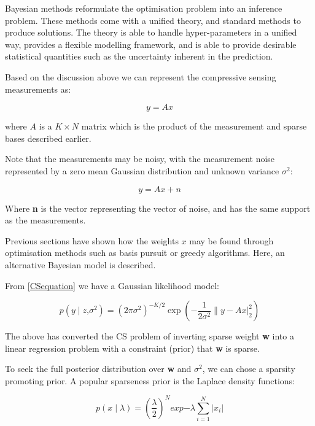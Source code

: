 \documentclass[12pt]{report}
\begin{document}
Bayesian methods reformulate the optimisation problem into an inference problem. These methods come with a unified theory, and standard methods to produce solutions. The theory is able to handle hyper-parameters in a unified way, provides a flexible modelling framework, and is able to provide desirable statistical quantities such as the uncertainty inherent in the prediction.

Based on the discussion above we can represent the compressive sensing measurements as: 

\begin{equation}
y = Ax
\end{equation}

where \(A\) is a \(K \times	N\) matrix which is the product of the measurement and sparse bases described earlier.

Note that the measurements may be noisy, with the measurement noise represented by a zero mean Gaussian distribution and unknown variance \( \sigma^2 \):

\begin{equation}
y = Ax + n
\end{equation}
\label{CSequation}

Where \textbf{n} is the vector representing the vector of noise, and has the same support as the measurements. 

Previous sections have shown how the weights \(x\) may be found through optimisation methods such as basis pursuit or greedy algorithms. Here, an alternative Bayesian model is described.

From \ref{CSequation} we have a Gaussian likelihood model: 

\begin{equation}
p \left(y \mid z\text{,} \sigma^2 \right) = (2 \pi \sigma^2)^{-K/2} \exp{\left(- \frac{1}{2 \sigma^2} \|y - Ax|_{2}^{2} \right)} 
\end{equation}

The above has converted the CS problem of inverting sparse weight \textbf{w} into a linear regression problem with a constraint (prior) that \textbf{w} is sparse. 

To seek the full posterior distribution over \textbf{w} and \( \sigma^2 \), we can chose a sparsity promoting prior. A popular sparseness prior is the Laplace density functions:

\begin{equation}
p\left(x\mid\lambda\right) = \left(\frac{\lambda}{2}\right)^N exp{-\lambda \sum_{i=1}^{N} |x_i|}
\end{equation}
\end{document}
